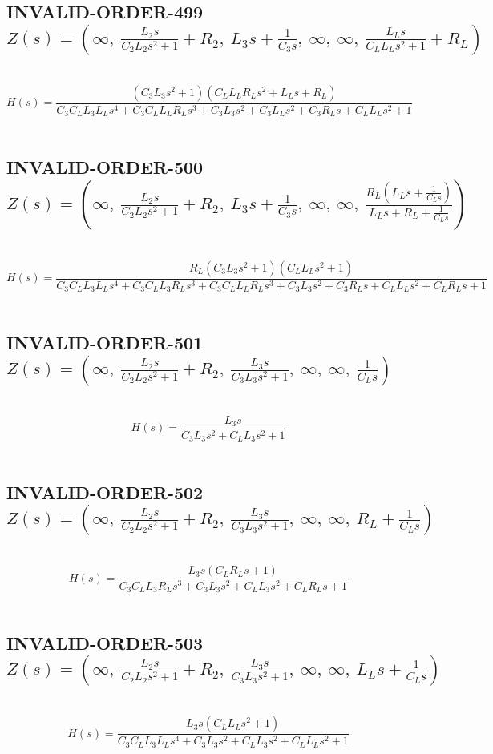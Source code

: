 \documentclass{article}
\begin{document}
\subsection{INVALID-ORDER-499 $Z(s) = \left( \infty, \  \frac{L_{2} s}{C_{2} L_{2} s^{2} + 1} + R_{2}, \  L_{3} s + \frac{1}{C_{3} s}, \  \infty, \  \infty, \  \frac{L_{L} s}{C_{L} L_{L} s^{2} + 1} + R_{L}\right)$ } \ 
\textbf{\[H(s) = \frac{\left(C_{3} L_{3} s^{2} + 1\right) \left(C_{L} L_{L} R_{L} s^{2} + L_{L} s + R_{L}\right)}{C_{3} C_{L} L_{3} L_{L} s^{4} + C_{3} C_{L} L_{L} R_{L} s^{3} + C_{3} L_{3} s^{2} + C_{3} L_{L} s^{2} + C_{3} R_{L} s + C_{L} L_{L} s^{2} + 1}\] } \ 
\subsection{INVALID-ORDER-500 $Z(s) = \left( \infty, \  \frac{L_{2} s}{C_{2} L_{2} s^{2} + 1} + R_{2}, \  L_{3} s + \frac{1}{C_{3} s}, \  \infty, \  \infty, \  \frac{R_{L} \left(L_{L} s + \frac{1}{C_{L} s}\right)}{L_{L} s + R_{L} + \frac{1}{C_{L} s}}\right)$ } \ 
\textbf{\[H(s) = \frac{R_{L} \left(C_{3} L_{3} s^{2} + 1\right) \left(C_{L} L_{L} s^{2} + 1\right)}{C_{3} C_{L} L_{3} L_{L} s^{4} + C_{3} C_{L} L_{3} R_{L} s^{3} + C_{3} C_{L} L_{L} R_{L} s^{3} + C_{3} L_{3} s^{2} + C_{3} R_{L} s + C_{L} L_{L} s^{2} + C_{L} R_{L} s + 1}\] } \ 
\subsection{INVALID-ORDER-501 $Z(s) = \left( \infty, \  \frac{L_{2} s}{C_{2} L_{2} s^{2} + 1} + R_{2}, \  \frac{L_{3} s}{C_{3} L_{3} s^{2} + 1}, \  \infty, \  \infty, \  \frac{1}{C_{L} s}\right)$ } \ 
\textbf{\[H(s) = \frac{L_{3} s}{C_{3} L_{3} s^{2} + C_{L} L_{3} s^{2} + 1}\] } \ 
\subsection{INVALID-ORDER-502 $Z(s) = \left( \infty, \  \frac{L_{2} s}{C_{2} L_{2} s^{2} + 1} + R_{2}, \  \frac{L_{3} s}{C_{3} L_{3} s^{2} + 1}, \  \infty, \  \infty, \  R_{L} + \frac{1}{C_{L} s}\right)$ } \ 
\textbf{\[H(s) = \frac{L_{3} s \left(C_{L} R_{L} s + 1\right)}{C_{3} C_{L} L_{3} R_{L} s^{3} + C_{3} L_{3} s^{2} + C_{L} L_{3} s^{2} + C_{L} R_{L} s + 1}\] } \ 
\subsection{INVALID-ORDER-503 $Z(s) = \left( \infty, \  \frac{L_{2} s}{C_{2} L_{2} s^{2} + 1} + R_{2}, \  \frac{L_{3} s}{C_{3} L_{3} s^{2} + 1}, \  \infty, \  \infty, \  L_{L} s + \frac{1}{C_{L} s}\right)$ } \ 
\textbf{\[H(s) = \frac{L_{3} s \left(C_{L} L_{L} s^{2} + 1\right)}{C_{3} C_{L} L_{3} L_{L} s^{4} + C_{3} L_{3} s^{2} + C_{L} L_{3} s^{2} + C_{L} L_{L} s^{2} + 1}\] } \ 
\end{document}
